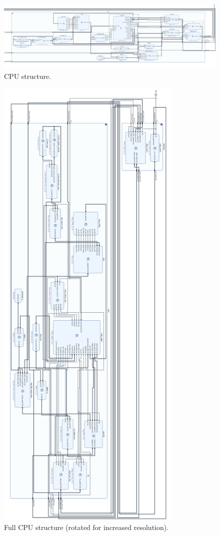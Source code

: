 \documentclass{article}
\begin{document}
\begin{par}
	\hspace{100pt}
	
	\begin{figure}[H]
		\centering
		\includegraphics[width=7in]{img/cpuov.png}
		\caption{CPU structure.}
	\end{figure}

	\begin{figure}[H]
		\centering
		\includegraphics[width=3.5in]{img/dsf.png}
		\caption{Full CPU structure (rotated for increased resolution).}
	\end{figure}
	
\end{par}
\end{document}
